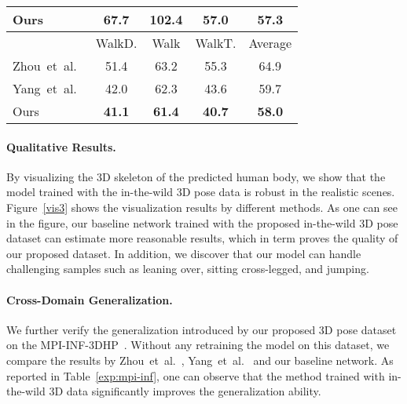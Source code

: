\documentclass[10pt,twocolumn,letterpaper]{article}
\def\etal{et~al.\xspace}
\begin{document}
\begin{table}[t]
{\begin{tabular}{lcccc}
Ours                                     & \textbf{67.7}    & 102.4     & \textbf{57.0}   & \textbf{57.3}    \\ \midrule
                                         & WalkD.  & Walk      & WalkT. & Average \\ \midrule
Zhou~\etal~\cite{zhou2017towards}        & 51.4    & 63.2      & 55.3   & 64.9    \\
Yang~\etal~\cite{yang20183d}             & 42.0    & 62.3      & 43.6   & 59.7    \\
Ours                                     & \textbf{41.1}    & \textbf{61.4}      & \textbf{40.7}   & \textbf{58.0}    \\ \bottomrule
\end{tabular}}
\label{wild_exp}
\vspace{-4mm}
\end{table}


\paragraph{Qualitative Results.}\vspace{-2mm}
By visualizing the 3D skeleton of the predicted human body, we show that the model trained with the in-the-wild 3D pose data is robust in the realistic scenes.
Figure~\ref{vis3} shows the visualization results by different methods.
As one can see in the figure, our baseline network trained with the proposed in-the-wild 3D pose dataset can estimate more reasonable results, which in term proves the quality of our proposed dataset.
In addition, we discover that our model can handle challenging samples such as leaning over, sitting cross-legged, and jumping.
\paragraph{Cross-Domain Generalization.}
We further verify the generalization introduced by our proposed 3D pose dataset on the MPI-INF-3DHP~\cite{mehta2016monocular}.
Without any retraining the model on this dataset, we compare the results by Zhou~\etal~\cite{zhou2017towards}, Yang~\etal~\cite{yang20183d} and our baseline network.
As reported in Table~\ref{exp:mpi-inf}, one can observe that the method trained with in-the-wild 3D data significantly improves the generalization ability.
\end{document}
